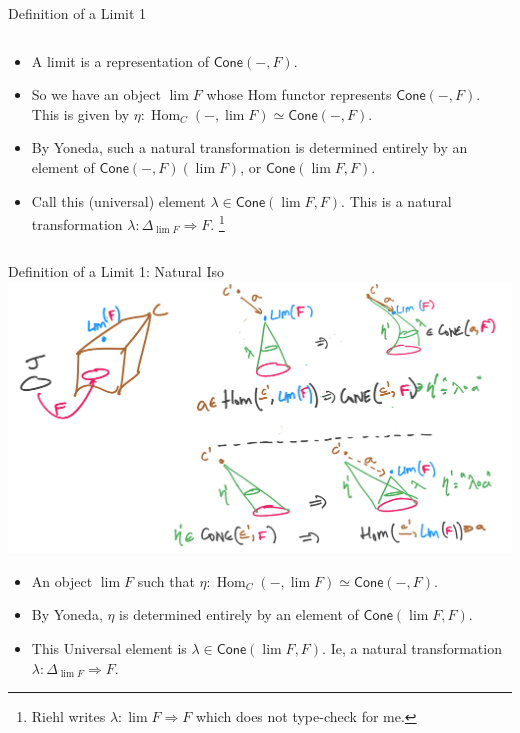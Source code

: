 \documentclass[8pt]{beamer}
\newcommand{\nt}{\Rightarrow}
\newcommand{\cat}[1]{\mathsf{#1}}
\newcommand{\cCone}{\cat{Cone}}
\newcommand{\Hom}{\ensuremath{\operatorname{Hom}}}
\begin{document}
\begin{frame}{Definition of a Limit 1}
\begin{columns}[T]
\begin{column}{.6\textwidth}
\begin{itemize}
        \item A limit is a representation of $\cCone(-, F)$. \pause
        \item So we have an object $\lim F$ whose Hom functor represents $\cCone(-, F)$.
              This is given by $\eta: \Hom_C(-, \lim F) \simeq \cCone(-, F)$. \pause
        \item By Yoneda, such a natural transformation is determined entirely by an element of
            $\cCone(-, F)(\lim F)$, or $\cCone(\lim F, F)$. \pause
        \item Call this (universal) element $\lambda \in \cCone(\lim F, F)$. This is a natural transformation
            $\lambda : \Delta_{\lim F} \nt F$. \pause \footnote{Riehl writes $\lambda: \lim F \nt F$ which does not type-check for me.}
     \end{itemize}
    \end{column}
    \end{columns}
\end{frame}

\begin{frame}{Definition of a Limit 1: Natural Iso}
    \includegraphics[width=\textwidth]{./natural-iso-limit-cone.png}
    {\footnotesize
    \begin{itemize}
    \item An object $\lim F$ such that $\eta: \Hom_C(-, \lim F) \simeq \cCone(-, F)$. 
    \item By Yoneda, $\eta$ is determined entirely by an element of $\cCone(\lim F, F)$. 
    \item This Universal element is $\lambda \in \cCone(\lim F, F)$. Ie, a natural transformation $\lambda : \Delta_{\lim F} \nt F$. 
     \end{itemize}
    }
\end{frame}
\end{document}
